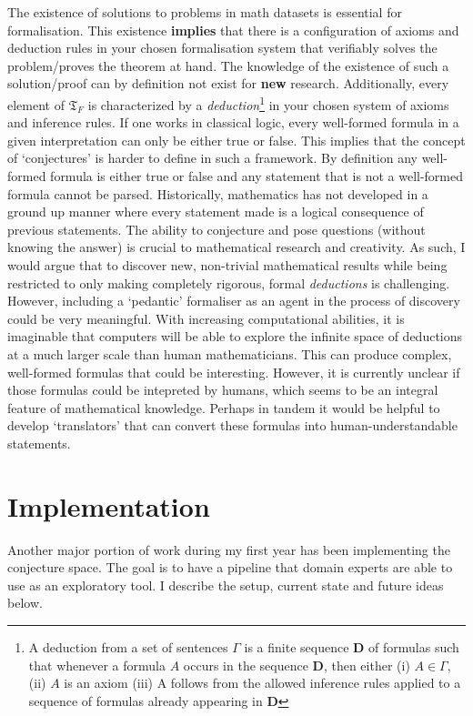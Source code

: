 The existence of solutions to problems in math datasets is essential for formalisation. This existence \textbf{implies} that there is a configuration of axioms and deduction rules in your chosen formalisation system that verifiably solves the problem/proves the theorem at hand.
The knowledge of the existence of such a solution/proof can by definition not exist for \textbf{new} research. Additionally, every element of $\mathfrak{T}_F$ is characterized by a \textit{deduction}\footnote[1]{A deduction from a set of sentences $\Gamma$ is a finite sequence \textbf{D} of formulas such that whenever a formula $A$ occurs in the sequence \textbf{D}, then either (i) $A\in\Gamma$, (ii) $A$ is an axiom (iii) A follows from the allowed inference rules applied to a sequence of formulas already appearing in \textbf{D}} in your chosen system of axioms and inference rules. 
If one works in classical logic, every well-formed formula in a given interpretation can only be either true or false. This implies that the concept of `conjectures' is harder to define in such a framework. By definition any well-formed formula is either true or false
and any statement that is not a well-formed formula cannot be parsed. Historically, mathematics has not developed in a ground up manner where every statement made is a logical consequence of previous statements. The ability to conjecture and pose questions (without knowing the answer) is crucial to mathematical research and creativity. As such, I would argue that to discover new, non-trivial mathematical results while being restricted to only making completely rigorous, formal \textit{deductions} is challenging.
However, including a `pedantic' formaliser as an agent in the process of discovery could be very meaningful. With increasing computational abilities, it is imaginable that computers will be able to explore the infinite space of deductions at a much larger scale than human mathematicians. This can produce
complex, well-formed formulas that could be interesting. However, it is currently unclear if those formulas could be intepreted by humans, which seems to be an integral feature of mathematical knowledge. Perhaps in tandem it would be helpful to develop `translators' that can convert these formulas into human-understandable statements.

\section{Implementation}
\label{sec:implementation}
Another major portion of work during my first year has been implementing the conjecture space. The goal is to have a pipeline that domain experts are able to use as an exploratory tool.
I describe the setup, current state and future ideas below.

